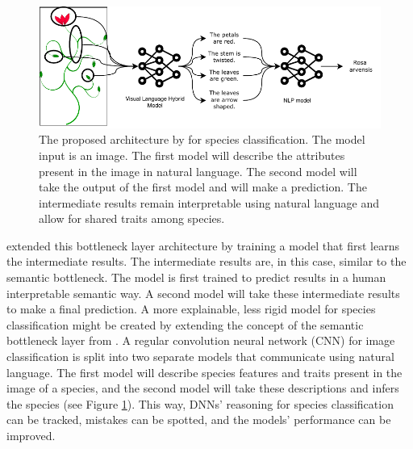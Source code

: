 \documentclass[a4paper, 12pt, oneside]{book} %
\begin{document}
\begin{figure} [tbp]
    \centering
    \vspace{0cm}
    \includegraphics[width=\textwidth]{figures/architecture_v2.pdf}
    \caption[Proposed architecture]{The proposed architecture by \textcite{ishikawa_contextual_2021} for species classification. The model input is an image. The first model will describe the attributes present in the image in natural language. The second model will take the output of the first model and will make a prediction. The intermediate results remain interpretable using natural language and allow for shared traits among species.}
    \label{fig:intro}
\end{figure}

\textcite{ishikawa_contextual_2021} extended this bottleneck layer architecture by training a model that first learns the intermediate results.
The intermediate results are, in this case, similar to the semantic bottleneck.
The model is first trained to predict results in a human interpretable semantic way.
A second model will take these intermediate results to make a final prediction.
A more explainable, less rigid model for species classification might be created by extending the concept of the semantic bottleneck layer from \textcite{ishikawa_contextual_2021}.
A regular convolution neural network (CNN) for image classification is split into two separate models that communicate using natural language.
The first model will describe species features and traits present in the image of a species, and the second model will take these descriptions and infers the species (see Figure \ref{fig:intro}).
This way, DNNs' reasoning for species classification can be tracked, mistakes can be spotted, and the models' performance can be improved.
\end{document}
